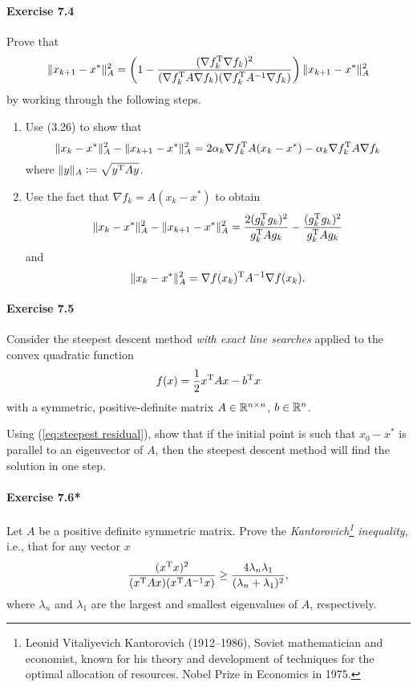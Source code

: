 \paragraph{Exercise 7.4} %
Prove that
\begin{equation}\label{eq:steepest residual}
  \|x_{k+1} - x^*\|_A^2
  = \left(1 - \frac{(\nabla f_k^{\text{\upshape T}}\nabla f_k)^2}{(\nabla f_k^{\text{\upshape T}} A\nabla f_k)(\nabla f_k^{\text{\upshape T}} A^{-1} \nabla f_k)}\right)\|x_{k+1} - x^*\|_A^2
\end{equation}
by working through the following steps.
\begin{enumerate}
  \item Use (3.26) to show that
\[
  \|x_k - x^*\|_A^2 - \|x_{k+1} - x^*\|_A^2 = 2\alpha_k\nabla f_k^{\text{\upshape T}} A(x_k-x^*) - \alpha_k \nabla f_k^{\text{\upshape T}} A \nabla f_k
\]
where $\|y\|_A\mathrel{\mathop:}= \sqrt{y^{\text{\upshape T}} Ay}$.
  \item Use the fact that $\nabla f_k = A(x_k - x^*)$ to obtain
    \[
      \|x_k-x^*\|_A^2 - \|x_{k+1}-x^*\|_A^2
      = \frac{2(g_k^{\text{\upshape T}} g_k)^2}{g_k^{\text{\upshape T}} A g_k} - \frac{(g_k^{\text{\upshape T}} g_k)^2}{g_k^{\text{\upshape T}} A g_k}
    \]
    and
    \[
      \|x_k-x^*\|_A^2 = \nabla f(x_k)^{\text{\upshape T}} A^{-1} \nabla f(x_k).
    \]
\end{enumerate}


\paragraph{Exercise 7.5} %
Consider the steepest descent method \emph{with exact line searches} applied
to the convex quadratic function
\begin{equation}\label{eq:convex quadratric}
  f(x) = \frac{1}{2} x^{\text{\upshape T}} A x - b^{\text{\upshape T}} x
\end{equation}
with a symmetric, positive-definite matrix $A\in\mathbb{R}^{n\times n}$, $b\in\mathbb{R}^n$.

Using (\ref{eq:steepest residual}), show that if the initial point is such
that $x_0 - x^*$ is parallel to an eigenvector of $A$, then the steepest
descent method will find the solution in one step.

\paragraph{Exercise 7.6*}
Let $A$ be a positive definite symmetric matrix. Prove the
\emph{Kantorovich\footnote{Leonid Vitaliyevich Kantorovich (1912--1986),
    Soviet mathematician and economist, known for his theory and development
    of techniques for the optimal allocation of resources. Nobel Prize in
    Economics in 1975.} inequality}, i.e., that for any vector $x$
\[
  \frac{(x^{\text{\upshape T}} x)^2}{(x^{\text{\upshape T}} A x)(x^{\text{\upshape T}} A^{-1}x)}
  \ge \frac{4\lambda_n\lambda_1}{(\lambda_n + \lambda_1)^2},
\]
where $\lambda_n$ and $\lambda_1$ are the largest and smallest eigenvalues of
$A$, respectively.

